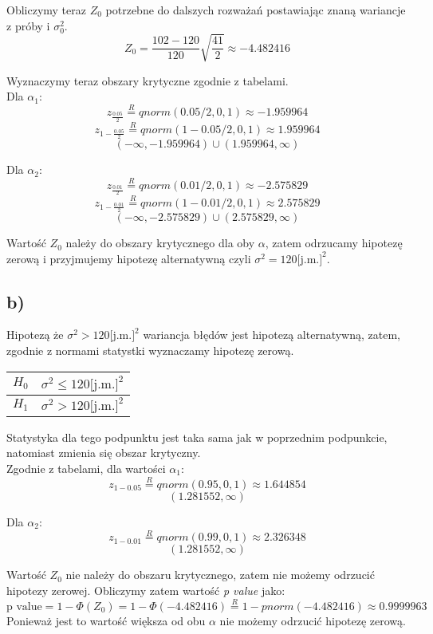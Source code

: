 \documentclass{article}
\begin{document}
Obliczymy teraz $Z_0$ potrzebne do dalszych rozważań postawiając znaną wariancje z próby i $\sigma^2_0$.
\[ Z_0 = \frac{102 - 120}{120} \sqrt{\frac{41}{2}} \approx -4.482416 \]

Wyznaczymy teraz obszary krytyczne zgodnie z tabelami. \\
Dla $\alpha_1$:
\[ z_{\frac{0.05}{2}} \overset{R}{=} qnorm(0.05/2, 0, 1) \approx -1.959964 \]
\[ z_{1 - \frac{0.05}{2}} \overset{R}{=} qnorm(1 - 0.05/2, 0, 1) \approx 1.959964 \]
\[ (-\infty, -1.959964) \cup (1.959964, \infty) \]

Dla $\alpha_2$:
\[ z_{\frac{0.01}{2}} \overset{R}{=} qnorm(0.01/2, 0, 1) \approx -2.575829\]
\[ z_{1 - \frac{0.01}{2}} \overset{R}{=} qnorm(1 - 0.01/2, 0, 1) \approx 2.575829 \]
\[ (-\infty, -2.575829) \cup (2.575829, \infty) \]

Wartość $Z_0$ należy do obszary krytycznego dla oby $\alpha$, zatem odrzucamy hipotezę zerową i przyjmujemy hipotezę alternatywną czyli $\sigma^2 = 120 \text{[j.m.]}^2$.

\subsection{b)}
Hipotezą że $\sigma^2 > 120 \text{[j.m.]}^2$ wariancja błędów jest hipotezą alternatywną, zatem, zgodnie z normami statystki wyznaczamy hipotezę zerową.
\begin{center} \begin{tabular}{|c|c|} \hline
$H_0$ & $\sigma^2 \leq 120 \text{[j.m.]}^2$ \\ \hline
$H_1$ & $\sigma^2 > 120 \text{[j.m.]}^2$ \\ \hline
\end{tabular} \end{center}

Statystyka dla tego podpunktu jest taka sama jak w poprzednim podpunkcie, natomiast zmienia się obszar krytyczny.\\
Zgodnie z tabelami, dla wartości $\alpha_1$:
\[z_{1 - 0.05} \overset{R}{=} qnorm(0.95, 0, 1) \approx 1.644854 \]
\[ (1.281552, \infty) \]

Dla $\alpha_2$:
\[z_{1 - 0.01} \overset{R}{=} qnorm(0.99, 0, 1) \approx 2.326348 \]
\[ (1.281552, \infty) \]

Wartość $Z_0$ nie należy do obszaru krytycznego, zatem nie możemy odrzucić hipotezy zerowej. Obliczymy zatem wartość \textit{p value} jako:
\[ \text{p value} = 1 - \Phi(Z_0) = 1 - \Phi(-4.482416) \overset{R}{=} 1 - pnorm(-4.482416) \approx 0.9999963 \]
Ponieważ jest to wartość większa od obu $\alpha$ nie możemy odrzucić hipotezę zerową.
\end{document}
